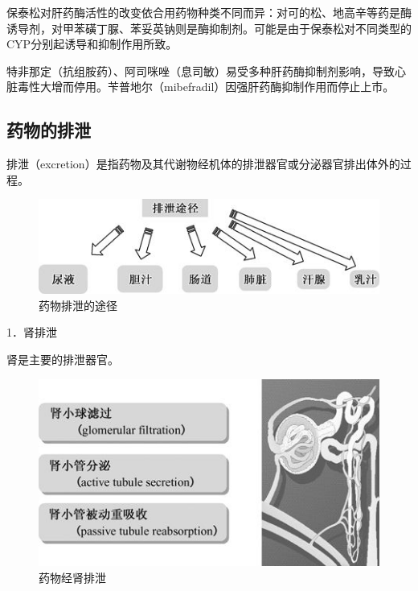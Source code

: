 保泰松对肝药酶活性的改变依合用药物种类不同而异：对可的松、地高辛等药是酶诱导剂，对甲苯磺丁脲、苯妥英钠则是酶抑制剂。可能是由于保泰松对不同类型的CYP分别起诱导和抑制作用所致。

特非那定（抗组胺药）、阿司咪唑（息司敏）易受多种肝药酶抑制剂影响，导致心脏毒性大增而停用。苄普地尔（mibefradil）因强肝药酶抑制作用而停止上市。

\subsection{药物的排泄}

排泄（excretion）是指药物及其代谢物经机体的排泄器官或分泌器官排出体外的过程。

\begin{figure}[!htbp]
 \centering
 \includegraphics{./images/Image00040.jpg}
 \captionsetup{justification=centering}
 \caption{药物排泄的途径}
 \label{fig3-11}
  \end{figure} 

1．肾排泄

肾是主要的排泄器官。

\begin{figure}[!htbp]
 \centering
 \includegraphics{./images/Image00041.jpg}
 \captionsetup{justification=centering}
 \caption{药物经肾排泄}
 \label{fig3-12}
  \end{figure} 

